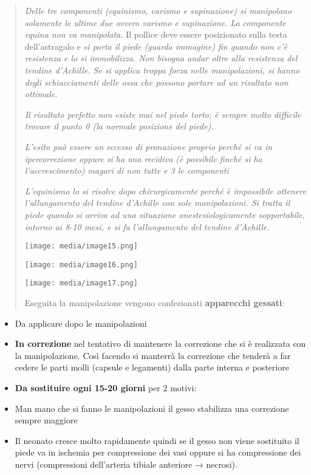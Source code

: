 \documentclass[]{article}
\begin{document}
\begin{quote}
\emph{Delle tre componenti (equinismo, varismo e supinazione) si
manipolano solamente le ultime due ovvero varismo e supinazione. La
componente equina non va manipolata.} Il pollice deve essere posizionato
sulla testa dell'astragalo e \emph{si porta il piede (guarda immagine)
fin quando non c'è resistenza e lo si immobilizza. Non bisogna andar
oltre alla resistenza del tendine d'Achille. Se si applica troppa forza
nelle manipolazioni, si hanno degli schiacciamenti delle ossa che
possono portare ad un risultato non ottimale. }

\emph{Il risultato perfetto non esiste mai nel piede torto; è sempre
molto difficile trovare il punto 0 (la normale posizione del piede).}

\emph{L'esito può essere un eccesso di pronazione proprio perché si va
in ipercorrezione oppure si ha una recidiva (è possibile finché si ha
l'accrescimento) magari di non tutte e 3 le componenti}

\emph{L'equinismo lo si risolve dopo chirurgicamente perché è
impossibile ottenere l'allungamento del tendine d'Achille con sole
manipolazioni. Si tratta il piede quando si arriva ad una situazione
anestesiologicamente sopportabile, intorno ai 8-10 mesi, e si fa
l'allungamento del tendine d'Achille.}

\texttt{[image: media/image15.png]}

\texttt{[image: media/image16.png]}

\texttt{[image: media/image17.png]}

Eseguita la manipolazione vengono confezionati \textbf{apparecchi
gessati}:
\end{quote}

\begin{itemize}
\item
  Da applicare dopo le manipolazioni
\item
  \textbf{In correzione} nel tentativo di mantenere la correzione che si
  è realizzata con la manipolazione. Così facendo si manterrà la
  correzione che tenderà a far cedere le parti molli (capsule e
  legamenti) dalla parte interna e posteriore
\item
  \textbf{Da sostituire ogni 15-20 giorni} per 2 motivi:
\end{itemize}

\begin{itemize}
\item
  Man mano che si fanno le manipolazioni il gesso stabilizza una
  correzione sempre maggiore
\item
  Il neonato cresce molto rapidamente quindi se il gesso non viene
  sostituito il piede va in ischemia per compressione dei vasi oppure si
  ha compressione dei nervi (compressioni dell'arteria tibiale anteriore
  → necrosi).
\end{itemize}
\end{document}
